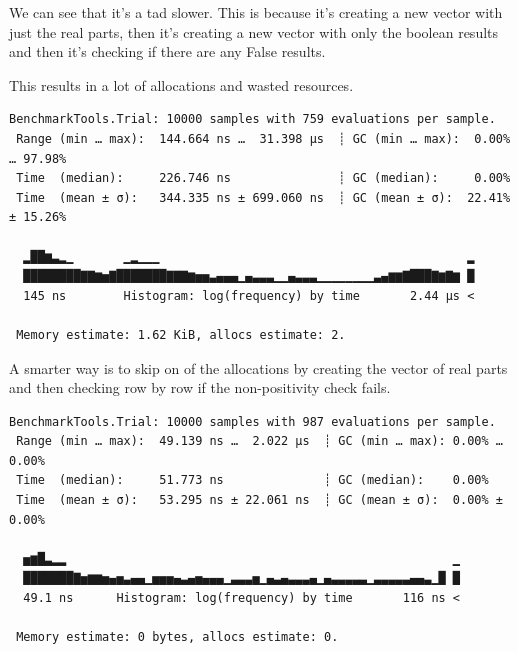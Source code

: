 \documentclass[
  a4paper,
  DIV=11,
  numbers=noendperiod]{scrreprt}
\newenvironment{Shaded}{\begin{snugshade}}{\end{snugshade}}
\newcommand{\FloatTok}[1]{\textcolor[rgb]{0.68,0.00,0.00}{#1}}
\newcommand{\FunctionTok}[1]{\textcolor[rgb]{0.28,0.35,0.67}{#1}}
\newcommand{\NormalTok}[1]{\textcolor[rgb]{0.00,0.23,0.31}{#1}}
\newcommand{\OperatorTok}[1]{\textcolor[rgb]{0.37,0.37,0.37}{#1}}
\newcommand{\PreprocessorTok}[1]{\textcolor[rgb]{0.68,0.00,0.00}{#1}}
\begin{document}
We can see that it's a tad slower. This is because it's creating a new
vector with just the real parts, then it's creating a new vector with
only the boolean results and then it's checking if there are any False
results.

This results in a lot of allocations and wasted resources.

\begin{Shaded}
\end{Shaded}

\begin{verbatim}
BenchmarkTools.Trial: 10000 samples with 759 evaluations per sample.
 Range (min … max):  144.664 ns …  31.398 μs  ┊ GC (min … max):  0.00% … 97.98%
 Time  (median):     226.746 ns               ┊ GC (median):     0.00%
 Time  (mean ± σ):   344.335 ns ± 699.060 ns  ┊ GC (mean ± σ):  22.41% ± 15.26%

  ▂██▆▃▂▁       ▁▂▁▁▁                                           ▂
  ████████▇▇▆▅▇███████▇▇▇▆▅▅▃▄▄▄▁▄▃▃▃▁▁▄▃▃▃▁▁▁▁▁▁▁▁▃▄▆▆▇███▇▆▇▆ █
  145 ns        Histogram: log(frequency) by time       2.44 μs <

 Memory estimate: 1.62 KiB, allocs estimate: 2.
\end{verbatim}

A smarter way is to skip on of the allocations by creating the vector of
real parts and then checking row by row if the non-positivity check
fails.

\begin{Shaded}
\end{Shaded}

\begin{verbatim}
BenchmarkTools.Trial: 10000 samples with 987 evaluations per sample.
 Range (min … max):  49.139 ns …  2.022 μs  ┊ GC (min … max): 0.00% … 0.00%
 Time  (median):     51.773 ns              ┊ GC (median):    0.00%
 Time  (mean ± σ):   53.295 ns ± 22.061 ns  ┊ GC (mean ± σ):  0.00% ± 0.00%

  ▅▆█▃▂▂                                                      ▁
  ███████▇▅▆▆▅▄▅▃▄▄▁▅▅▅▄▃▄▅▄▄▄▁▃▃▃▅▁▄▃▄▃▃▃▄▁▄▃▃▃▃▃▁▃▃▃▃▃▄▄▃▁█ █
  49.1 ns      Histogram: log(frequency) by time       116 ns <

 Memory estimate: 0 bytes, allocs estimate: 0.
\end{verbatim}
\end{document}
